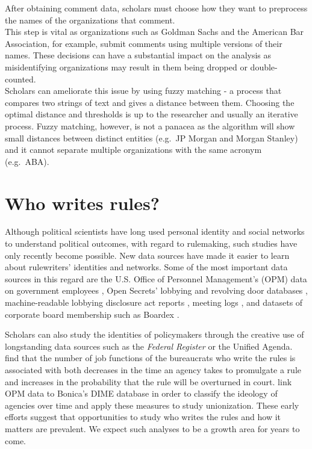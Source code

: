 \documentclass[
      12pt,
        ]{article}
\let\footnote = \endnote
\begin{document}
\indent After obtaining comment data, scholars must choose how they want
to preprocess the names of the organizations that comment.\\
This step is vital as organizations such as Goldman Sachs and the
American Bar Association, for example, submit comments using multiple
versions of their names. These decisions can have a substantial impact
on the analysis as misidentifying organizations may result in them being
dropped or double-counted.\\
Scholars can ameliorate this issue by using fuzzy matching - a process
that compares two strings of text and gives a distance between them.
Choosing the optimal distance and thresholds is up to the researcher and
usually an iterative process. Fuzzy matching, however, is not a panacea
as the algorithm will show small distances between distinct entities
(e.g.~JP Morgan and Morgan Stanley) and it cannot separate multiple
organizations with the same acronym (e.g.~ABA).

\hypertarget{who-writes-rules}{%
\section{Who writes rules?}\label{who-writes-rules}}

Although political scientists have long used personal identity and
social networks to understand political outcomes, with regard to
rulemaking, such studies have only recently become possible. New data
sources have made it easier to learn about rulewriters' identities and
networks. Some of the most important data sources in this regard are the
U.S. Office of Personnel Management's (OPM) data on government employees
\citep[e.g.,][]{BoltonAMP2018},\footnote{Note that the dataset
  \citet{BoltonAMP2018} used is not public.} Open Secrets' lobbying
\citep[e.g.,][]{Baumgartner2009} and revolving door databases
\citep[e.g.,][]{VidalAER2012, BertrandAER2014}, machine-readable
lobbying disclosure act reports
\citep[e.g.,][]{BoehmkeJPP2013, YouJOP2017, Dwidar2019SPSA}, meeting
logs \citep{LibgoberQJPS}, and datasets of corporate board membership
such as Boardex \citep[e.g.,][]{ShiveROF2016}.

Scholars can also study the identities of policymakers through the
creative use of longstanding data sources such as the \emph{Federal
Register} or the Unified Agenda. \citet{CarriganPAR2019} find that the
number of job functions of the bureaucrats who write the rules is
associated with both decreases in the time an agency takes to promulgate
a rule and increases in the probability that the rule will be overturned
in court. \citet{ChenJTP2015} link OPM data to Bonica's DIME database in
order to classify the ideology of agencies over time and apply these
measures to study unionization. These early efforts suggest that
opportunities to study who writes the rules and how it matters are
prevalent. We expect such analyses to be a growth area for years to
come.
\end{document}
